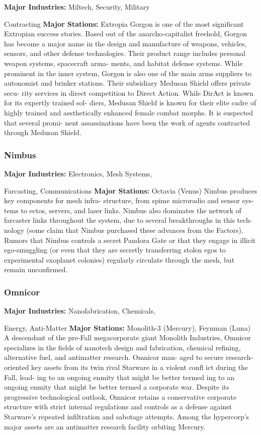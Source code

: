 \textbf{Major Industries:} Miltech, Security, Military 

Contracting
\textbf{Major Stations:} Extropia
Gorgon is one of the most significant  Extropian 
success stories. Based out of the anarcho-capitalist 
freehold, Gorgon has become a major name in the 
design and manufacture of weapons, vehicles, sensors, 
and other defense technologies. Their product range 
includes personal weapon systems, spacecraft arma-
ments, and habitat defense systems. While prominent 
in the inner system, Gorgon is also one of the main 
arms suppliers to autonomist and brinker stations. 
Their subsidiary Medusan Shield offers private secu-
rity services in direct competition to Direct Action. 
While DirAct is known for its expertly trained sol-
diers, Medusan Shield is known for their elite cadre 
of highly trained and aesthetically enhanced female 
combat morphs. It is suspected that several promi-
nent assassinations have been the work of agents 
contracted through Medusan Shield.

\subsubsection{Nimbus}

\textbf{Major Industries:} Electronics, Mesh Systems, 

Farcasting, Communications
\textbf{Major Stations:} Octavia (Venus)
Nimbus produces key components for mesh infra-
structure, from spime microradio and sensor sys-
tems to ectos, servers, and laser links. Nimbus also 
dominates the network of farcaster links throughout 
the system, due to several breakthroughs in this tech-
nology (some claim that Nimbus purchased these 
advances from the Factors). Rumors that Nimbus 
controls a secret Pandora Gate or that they engage 
in illicit ego-smuggling (or even that they are secretly 
transferring stolen egos to experimental exoplanet 
colonies) regularly circulate through the mesh, but 
remain unconfirmed.

\subsubsection{Omnicor}

\textbf{Major Industries:} Nanofabrication, Chemicals, 

Energy, Anti-Matter
\textbf{Major Stations:} Monolith-3 (Mercury), Feynman (Luna)
A descendant of the pre-Fall megacorporate giant 
Monolith Industries, Omnicor specializes in the fields 
of nanotech design and fabrication, chemical refining, 
alternative fuel, and antimatter research. Omnicor man-
aged to secure research-oriented key assets from its twin 
rival Starware in a violent confl ict during the Fall, lead-
ing to an ongoing enmity that might be better termed 
ing to an ongoing enmity that might be better termed
a corporate war. Despite its progressive technological 
outlook, Omnicor retains a conservative corporate 
structure with strict internal regulations and controls 
as a defense against Starware's repeated infiltration and 
sabotage attempts. Among the hypercorp's major assets 
are an antimatter research facility orbiting Mercury.

